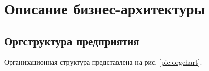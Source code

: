 %
%
\newpage

\chapter{Описание бизнес-архитектуры}

\section{Оргструктура предприятия}

Организационная структура представлена на рис. \ref{pic:orgchart}.


